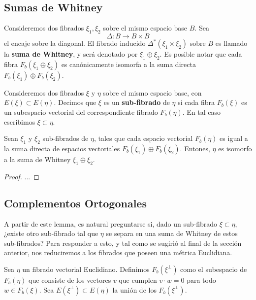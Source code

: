 \subsection{Sumas de Whitney}

Consideremos dos fibrados $\xi_{1}, \xi_{2}$ sobre el mismo espacio base $B$. Sea
\[ \Delta \colon B \to B \times B \]
el encaje sobre la diagonal. El fibrado inducido $\Delta^{*}(\xi_{1} \times \xi_{2})$ sobre $B$ es llamado la \textbf{suma de Whitney}, y será denotado por $\xi_{1} \oplus \xi_{2}$. Es posible notar que cada fibra $F_{b}(\xi_{1} \oplus \xi_{2})$ es canónicamente isomorfa a la suma directa $F_{b}(\xi_{1}) \oplus F_{b}(\xi_{2})$.

\begin{definition}
	Consideremos dos fibrados $\xi$ y $\eta$ sobre el mismo espacio base, con $E(\xi) \subset E(\eta)$. Decimos que $\xi$ es un \textbf{sub-fibrado} de $\eta$ si cada fibra $F_{b}(\xi)$ es un subespacio vectorial del correspondiente fibrado $F_{b}(\eta)$. En tal caso escribimos $\xi \subset \eta$.
\end{definition}

\begin{lemma}
	Sean $\xi_{1}$ y $\xi_{2}$ sub-fibrados de $\eta$, tales que cada espacio vectorial $F_{b}(\eta)$ es igual a la suma directa de espacios vectoriales $F_{b}(\xi_{1}) \oplus F_{b}(\xi_{2})$. Entones, $\eta$ es isomorfo a la suma de Whitney $\xi_{1} \oplus \xi_{2}$.
\end{lemma}
\begin{proof}
	...
\end{proof}

\subsection{Complementos Ortogonales}

A partir de este lemma, es natural preguntarse si, dado un sub-fibrado $\xi \subset \eta$, ¿existe otro sub-fibrado tal que $\eta$ se separa en una suma de Whitney de estos sub-fibrados? Para responder a esto, y tal como se sugirió al final de la sección anterior, nos reduciremos a los fibrados que poseen una métrica Euclidiana. \par

Sea $\eta$ un fibrado vectorial Euclidiano. Definimos $F_{b}(\xi^{\perp})$ como el subespacio de $F_{b}(\eta)$ que consiste de los vectores $v$ que cumplen $v \cdot w = 0$ para todo $w \in F_{b}(\xi)$. Sea $E(\xi^{\perp}) \subset E(\eta)$ la unión de los $F_{b}(\xi^{\perp})$.


